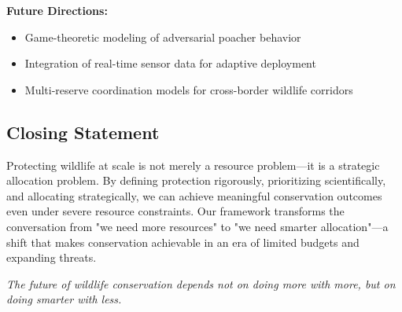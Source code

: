 \textbf{Future Directions:}
\begin{itemize}
\item Game-theoretic modeling of adversarial poacher behavior
\item Integration of real-time sensor data for adaptive deployment
\item Multi-reserve coordination models for cross-border wildlife corridors
\end{itemize}

\subsection{Closing Statement}

Protecting wildlife at scale is not merely a resource problem—it is a strategic allocation problem. By defining protection rigorously, prioritizing scientifically, and allocating strategically, we can achieve meaningful conservation outcomes even under severe resource constraints. Our framework transforms the conversation from "we need more resources" to "we need smarter allocation"—a shift that makes conservation achievable in an era of limited budgets and expanding threats.

\vspace{0.5cm}

\noindent \textit{The future of wildlife conservation depends not on doing more with more, but on doing smarter with less.}
